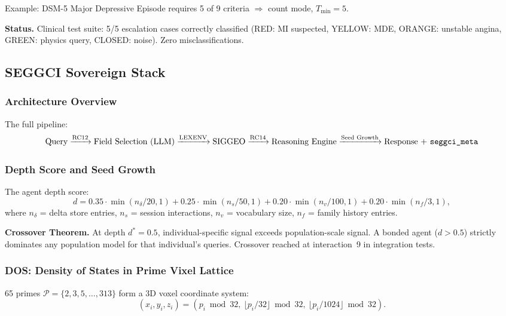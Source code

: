 \documentclass[11pt,twoside]{article}
\begin{document}
Example: DSM-5 Major Depressive Episode requires 5 of 9 criteria $\Rightarrow$ count mode,
$T_{\min} = 5$.

\begin{confirmedenv}
\textbf{Status.} Clinical test suite: 5/5 escalation cases correctly classified
(RED: MI suspected, YELLOW: MDE, ORANGE: unstable angina, GREEN: physics query,
CLOSED: noise). Zero misclassifications.
\end{confirmedenv}

\subsection{SEGGCI Sovereign Stack}

\subsubsection{Architecture Overview}

The full pipeline:
\[
  \text{Query}
  \xrightarrow{\text{RC12}}
  \text{Field Selection (LLM)}
  \xrightarrow{\text{LEXENV}}
  \text{SIGGEO}
  \xrightarrow{\text{RC14}}
  \text{Reasoning Engine}
  \xrightarrow{\text{Seed Growth}}
  \text{Response + \texttt{seggci\_meta}}
\]

\subsubsection{Depth Score and Seed Growth}

The agent depth score:
\[
  d = 0.35\cdot\min(n_\delta/20, 1)
    + 0.25\cdot\min(n_s/50, 1)
    + 0.20\cdot\min(n_v/100, 1)
    + 0.20\cdot\min(n_f/3, 1),
\]
where $n_\delta$ = delta store entries, $n_s$ = session interactions,
$n_v$ = vocabulary size, $n_f$ = family history entries.

\textbf{Crossover Theorem.} At depth $d^* = 0.5$, individual-specific signal exceeds
population-scale signal. A bonded agent ($d > 0.5$) strictly dominates any
population model for that individual's queries. Crossover reached at interaction~9
in integration tests.

\subsubsection{DOS: Density of States in Prime Vixel Lattice}

65 primes $\mathcal{P} = \{2, 3, 5, \ldots, 313\}$ form a 3D voxel coordinate system:
\[
  (x_i, y_i, z_i) = (p_i \bmod 32,\ \lfloor p_i/32 \rfloor \bmod 32,\ \lfloor p_i/1024 \rfloor \bmod 32).
\]
\end{document}
